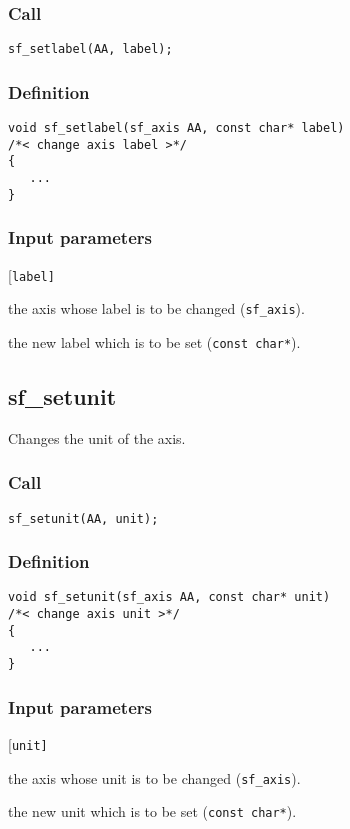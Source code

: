 \subsubsection*{Call}
\begin{verbatim}sf_setlabel(AA, label);\end{verbatim}

\subsubsection*{Definition}
\begin{verbatim}  
void sf_setlabel(sf_axis AA, const char* label)
/*< change axis label >*/
{
   ...
}
\end{verbatim}

\subsubsection{Input parameters}
\begin{desclist}{\tt }{\quad}[\tt label]
   \setlength\itemsep{0pt}
   \item[AA]    the axis whose label is to be changed (\texttt{sf\_axis}).  
   \item[label] the new label which is to be set (\texttt{const char*}).  
\end{desclist}




\subsection{{sf\_setunit}}
Changes the unit of the axis.

\subsubsection*{Call}
\begin{verbatim}sf_setunit(AA, unit);\end{verbatim}

\subsubsection*{Definition}
\begin{verbatim}  
void sf_setunit(sf_axis AA, const char* unit)
/*< change axis unit >*/
{
   ...
}
\end{verbatim}

\subsubsection{Input parameters}
\begin{desclist}{\tt }{\quad}[\tt unit]
   \setlength\itemsep{0pt}
   \item[AA]   the axis whose unit is to be changed (\texttt{sf\_axis}).  
   \item[unit] the new unit which is to be set (\texttt{const char*}).  
\end{desclist}

